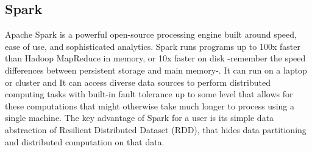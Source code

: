 \documentclass[12pt,twoside]{article}
\begin{document}
\subsection{Spark}
Apache Spark is a powerful open-source processing engine built around speed, ease of use, and sophisticated analytics. Spark runs programs up to 100x faster than Hadoop MapReduce in memory, or 10x faster on disk -remember the speed differences between persistent storage and main memory-. It can run on a laptop or cluster and It can access diverse data sources to perform 
distributed computing tasks with built-in fault tolerance up to some level that allows for these computations that might otherwise take much longer to process using a single machine.
The key advantage of Spark for a user is its simple data abstraction of Resilient Distributed Dataset (RDD), that hides data partitioning and distributed computation on that data.
\end{document}
